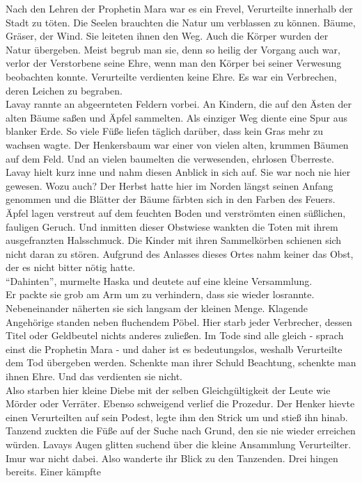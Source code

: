 Nach den Lehren der Prophetin Mara war es ein Frevel, Verurteilte innerhalb der Stadt zu töten. Die 
Seelen brauchten die Natur um verblassen zu können. Bäume, Gräser, der Wind. Sie leiteten ihnen den 
Weg. Auch die Körper wurden der Natur übergeben. Meist begrub man sie, denn so heilig der Vorgang 
auch war, verlor der Verstorbene seine Ehre, wenn man den Körper bei seiner Verwesung beobachten 
konnte. Verurteilte verdienten keine Ehre. Es war ein Verbrechen, deren Leichen zu begraben.\\
Lavay rannte an abgeernteten Feldern vorbei. An Kindern, die auf den Ästen der alten Bäume saßen 
und Äpfel sammelten. Als einziger Weg diente eine Spur aus blanker Erde. So viele Füße liefen 
täglich darüber, dass kein Gras mehr zu wachsen wagte. Der Henkersbaum war einer von vielen alten, 
krummen Bäumen auf dem Feld. Und an vielen baumelten die verwesenden, ehrlosen Überreste. Lavay 
hielt kurz inne und nahm diesen Anblick in sich auf. Sie war noch nie hier gewesen. Wozu auch? 
Der Herbst hatte hier im Norden längst seinen Anfang genommen und die Blätter der Bäume färbten 
sich in den Farben des Feuers. Äpfel lagen verstreut auf dem feuchten Boden und verströmten einen 
süßlichen, fauligen Geruch. Und inmitten dieser Obstwiese wankten die Toten mit ihrem ausgefranzten 
Halsschmuck. Die Kinder mit ihren Sammelkörben schienen sich nicht daran zu stören. Aufgrund des 
Anlasses dieses Ortes nahm keiner das Obst, der es nicht bitter nötig hatte. \\
``Dahinten'', murmelte Haska und deutete auf eine kleine Versammlung. \\
Er packte sie grob am Arm um zu verhindern, dass sie wieder losrannte. Nebeneinander näherten sie 
sich langsam der kleinen Menge. Klagende Angehörige standen neben fluchendem Pöbel. Hier starb 
jeder Verbrecher, dessen Titel oder Geldbeutel nichts anderes zuließen. Im Tode sind alle gleich - 
sprach einst die Prophetin Mara - und daher ist es bedeutungslos, weshalb Verurteilte dem Tod 
übergeben werden. Schenkte man ihrer Schuld Beachtung, schenkte man ihnen Ehre. Und das verdienten 
sie nicht. \\
Also starben hier kleine Diebe mit der selben Gleichgültigkeit der Leute wie Mörder oder Verräter. 
Ebenso schweigend verlief die Prozedur. Der Henker hievte einen Verurteilten auf sein Podest, legte 
ihm den Strick um und stieß ihn hinab. Tanzend zuckten die Füße auf der Suche nach Grund, den sie 
nie wieder erreichen würden. Lavays Augen glitten suchend über die kleine Ansammlung Verurteilter. 
Imur war nicht dabei. Also wanderte ihr Blick zu den Tanzenden. Drei hingen bereits. Einer kämpfte 
